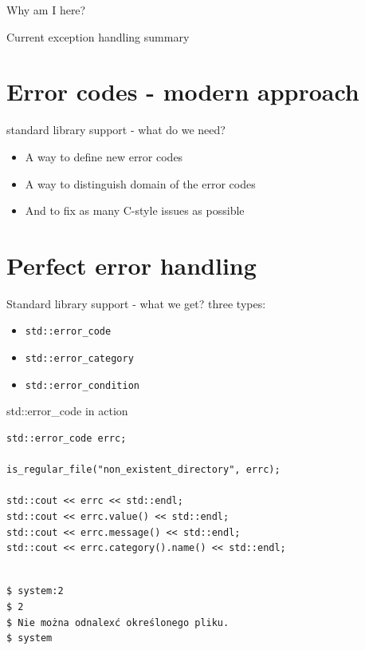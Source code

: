 \documentclass[10pt]{beamer}
\begin{document}
\begin{frame}{Why am I here?}
\begin{frame}{Current exception handling summary}
	\centering

\section{Error codes - modern approach}
\begin{frame}{standard library support - what do we need?}
	\begin{itemize}
		\item A way to define new error codes
		\item A way to distinguish domain of the error codes
		\item And to fix as many C-style issues as possible
	\end{itemize}
\end{frame}
	
\section{Perfect error handling}

\begin{frame}{Standard library support - what we get?}
	three types:
	\begin{itemize}
		\item \texttt{std::error\_code}
		\item \texttt{std::error\_category}
		\item \texttt{std::error\_condition}
	\end{itemize}
\end{frame}

\begin{frame}[fragile]{std::error\_code in action}
	\begin{verbatim}
std::error_code errc;

is_regular_file("non_existent_directory", errc);

std::cout << errc << std::endl;
std::cout << errc.value() << std::endl;
std::cout << errc.message() << std::endl;
std::cout << errc.category().name() << std::endl;
	\end{verbatim}
	
	\hrulefill
	
	\texttt{\\
		\$ system:2 \\
		\$ 2 \\
		\$ Nie można odnalexć określonego pliku. \\
		\$ system}
\end{frame}
	

\end{frame}
\end{frame}
\end{document}
